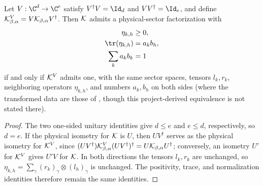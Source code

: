 \begin{lemma}
    \label{thm:mpdo_neighboring_trace_factorization_physical_basis_invariant}
    \leanok
    Let $V:\C^d\to\C^e$ satisfy
    $V^\dagger V=\Id_d$ and $VV^\dagger=\Id_e$, and define
    ${\cal K}^V_{\beta,\alpha}
        =V{\cal K}_{\beta,\alpha}V^\dagger$.  Then ${\cal K}$ admits a
    physical-sector factorization with
    \begin{align}
        \eta_{k,h}      & \geq 0,
        \notag                     \\
        \tr(\eta_{k,h}) & =a_kb_h,
        \notag                     \\
        \sum_k a_kb_k   & =1
        \notag
    \end{align}
    if and only if ${\cal K}^V$ admits one, with the same sector spaces,
    tensors $l_k,r_k$, neighboring operators $\eta_{k,h}$, and numbers
    $a_k,b_h$ on both sides (where the transformed data are those of
    \cite[Theorem~4.9(iv) and Appendix~C.2, lines~1381--1450]
    {Cirac2016MPDO_arXiv}, though this project-derived equivalence is not
    stated there).
\end{lemma}

\begin{proof}
    \leanok
    The two one-sided unitary identities give $d\leq e$ and $e\leq d$,
    respectively, so $d=e$.  If the physical isometry for
    ${\cal K}$ is $U$, then $UV^\dagger$ serves as the physical isometry for
    ${\cal K}^V$, since
    $(UV^\dagger){\cal K}^V_{\beta,\alpha}(UV^\dagger)^\dagger
        =U{\cal K}_{\beta,\alpha}U^\dagger$; conversely, an isometry $U'$ for
    ${\cal K}^V$ gives $U'V$ for ${\cal K}$.  In both directions the
    tensors $l_k,r_k$ are unchanged, so
    $\eta_{k,h}=\sum_\gamma(r_k)_\gamma\otimes(l_h)_\gamma$ is unchanged.
    The positivity, trace, and normalization identities therefore remain the
    same identities.
\end{proof}


